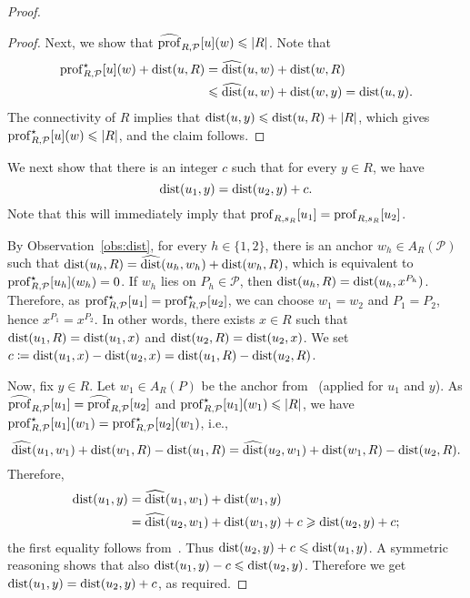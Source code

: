 \begin{proof}
\begin{proof}
    Next, we show that $\widehat{\mathrm{prof}}_{R,\mathcal{P}}[u](w)\leqslant |R|$. Note that
    \begin{align*}
      \mathrm{prof}^\star_{R,\mathcal{P}}[u](w) + \mathrm{dist}(u,R) & = \widehat{\mathrm{dist}}(u,w)+\mathrm{dist}(w,R)\\
      & \leqslant \widehat{\mathrm{dist}}(u,w)+\mathrm{dist}(w,y)= \mathrm{dist}(u,y).
    \end{align*}
    The connectivity of $R$ implies that $\mathrm{dist}(u,y)\leqslant \mathrm{dist}(u,R)+|R|$, which gives
    $\mathrm{prof}^\star_{R,\mathcal{P}}[u](w)\leqslant |R|$, and the claim follows.
  \end{proof}

  We next show that
  there is an integer $c$ such that for every $y\in R$, we have
  $$\mathrm{dist}(u_1,y)=\mathrm{dist}(u_2,y)+c.$$
  Note that this will immediately imply that
  $\mathrm{prof}_{R,s_R}[u_1]=\mathrm{prof}_{R,s_R}[u_2]$.

  By Observation~\ref{obs:dist}, for every $h \in \{1,2\}$, there is an anchor $w_h \in A_R(\mathcal{P})$
  such that $\mathrm{dist}(u_h,R) = \widehat{\mathrm{dist}}(u_h,w_h) + \mathrm{dist}(w_h, R)$, which is equivalent to
  $\mathrm{prof}^\star_{R,\mathcal{P}}[u_h](w_h) = 0$. 
  If $w_h$ lies on $P_h \in \mathcal{P}$, then $\mathrm{dist}(u_h,R) = \mathrm{dist}(u_h,x^{P_h})$. 
  Therefore, as $\mathrm{prof}^\star_{R,\mathcal{P}}[u_1]=\mathrm{prof}^\star_{R,\mathcal{P}}[u_2]$,
  we can choose $w_1 = w_2$ and $P_1 = P_2$, hence $x^{P_1} = x^{P_2}$. 
  In other words, there exists $x\in R$ such that $\mathrm{dist}(u_1,R) = \mathrm{dist}(u_1,x)$ and $\mathrm{dist}(u_2,R) = \mathrm{dist}(u_2,x)$.
  We set $c\coloneqq \mathrm{dist}(u_1,x)-\mathrm{dist}(u_2,x)=\mathrm{dist}(u_1,R)-\mathrm{dist}(u_2,R)$.

  Now, fix $y\in R$.
  Let $w_1\in A_R(P)$ be the anchor from~ (applied for $u_1$ and $y$).
  As $\widehat{\mathrm{prof}}_{R,\mathcal{P}}[u_1] = \widehat{\mathrm{prof}}_{R,\mathcal{P}}[u_2]$ and
  $\mathrm{prof}^\star_{R,\mathcal{P}}[u_1](w_1)\leqslant |R|$, we have
   $\mathrm{prof}^\star_{R,\mathcal{P}}[u_1](w_1) = \mathrm{prof}^\star_{R,\mathcal{P}}[u_2](w_1)$, i.e.,
  \[\widehat{\mathrm{dist}}(u_1,w_1) + \mathrm{dist}(w_1,R) - \mathrm{dist}(u_1,R) = \widehat{\mathrm{dist}}(u_2,w_1) + \mathrm{dist}(w_1,R)- \mathrm{dist}(u_2,R).\]
  Therefore,
  \begin{align*}
    \mathrm{dist}(u_1,y) &= \widehat{\mathrm{dist}}(u_1,w_1) + \mathrm{dist}(w_1,y)\\
      & =\widehat{\mathrm{dist}}(u_2,w_1) + \mathrm{dist}(w_1,y)+c\geqslant \mathrm{dist}(u_2,y)+c;
  \end{align*}
  the first equality follows from~.
  Thus $\mathrm{dist}(u_2,y)+c\leqslant \mathrm{dist}(u_1,y)$.
  A symmetric reasoning shows that also $\mathrm{dist}(u_1,y)-c\leqslant\mathrm{dist}(u_2,y)$.
  Therefore we get $\mathrm{dist}(u_1,y) = \mathrm{dist}(u_2,y)+c$, as required.
\end{proof}

